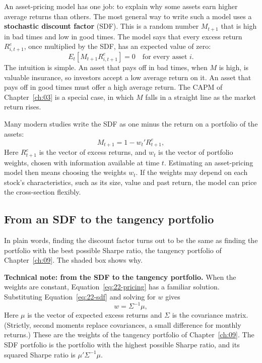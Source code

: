 An asset-pricing model has one job: to explain why some assets earn higher average returns than others. The most general way to write such a model uses a \textbf{stochastic discount factor} (SDF). This is a random number $M_{t+1}$ that is high in bad times and low in good times. The model says that every excess return $R^e_{i,t+1}$, once multiplied by the SDF, has an expected value of zero:
\begin{equation}
  E_t\!\left[ M_{t+1} R^e_{i,t+1} \right] = 0 \quad \text{for every asset } i.
  \label{eq:22-pricing}
\end{equation}
The intuition is simple. An asset that pays off in bad times, when $M$ is high, is valuable insurance, so investors accept a low average return on it. An asset that pays off in good times must offer a high average return. The CAPM of Chapter~\ref{ch:03} is a special case, in which $M$ falls in a straight line as the market return rises.

Many modern studies write the SDF as one minus the return on a portfolio of the assets:
\begin{equation}
  M_{t+1} = 1 - w_t' R^e_{t+1},
  \label{eq:22-sdf}
\end{equation}
Here $R^e_{t+1}$ is the vector of excess returns, and $w_t$ is the vector of portfolio weights, chosen with information available at time $t$. Estimating an asset-pricing model then means choosing the weights $w_t$. If the weights may depend on each stock's characteristics, such as its size, value and past return, the model can price the cross-section flexibly.

\subsection{From an SDF to the tangency portfolio}

In plain words, finding the discount factor turns out to be the same as finding the portfolio with the best possible Sharpe ratio, the tangency portfolio of Chapter~\ref{ch:09}. The shaded box shows why.

\begin{technote}
\textbf{Technical note: from the SDF to the tangency portfolio.} When the weights are constant, Equation~\eqref{eq:22-pricing} has a familiar solution. Substituting Equation~\eqref{eq:22-sdf} and solving for $w$ gives
\begin{equation}
  w = \Sigma^{-1} \mu,
  \label{eq:22-tangency}
\end{equation}
Here $\mu$ is the vector of expected excess returns and $\Sigma$ is the covariance matrix. (Strictly, second moments replace covariances, a small difference for monthly returns.) These are the weights of the tangency portfolio of Chapter~\ref{ch:09}. The SDF portfolio is the portfolio with the highest possible Sharpe ratio, and its squared Sharpe ratio is $\mu'\Sigma^{-1}\mu$.
\end{technote}

